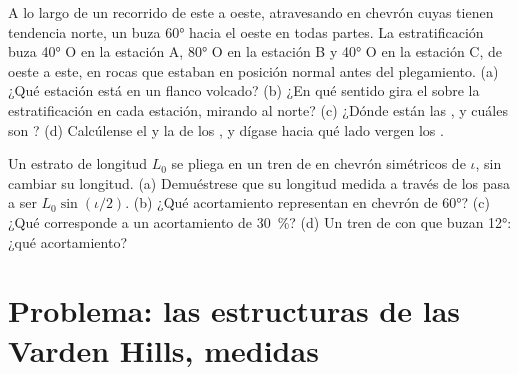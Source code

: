 \begin{exercise}[$\star\star\star$]\label{exo:b1:faults-folds-fabrics:11}
A lo largo de un recorrido de este a oeste, atravesando  en chevrón cuyas  tienen tendencia norte, un  buza \ang{60} hacia el oeste en todas partes. La estratificación buza \ang{40} O en la estación A, \ang{80} O en la
estación B y \ang{40} O en la estación C, de oeste a este, en rocas que estaban en posición normal antes del plegamiento. (a) ¿Qué
estación está en un flanco volcado? (b) ¿En qué sentido gira el  sobre la estratificación en cada estación, mirando al
norte? (c) ¿Dónde están las , y cuáles son ? (d) Calcúlense el  y la  de los
, y dígase hacia qué lado vergen los .
\end{exercise}

\begin{exercise}[$\star\star\star$]\label{exo:b1:faults-folds-fabrics:12}
Un estrato de longitud $L_0$ se pliega en un tren de  en chevrón simétricos de  $\iota$, sin cambiar
su longitud. (a) Demuéstrese que su longitud medida a través de los  pasa a ser $L_0\sin(\iota/2)$. (b) ¿Qué acortamiento
representan  en chevrón de  \ang{60}? (c) ¿Qué  corresponde a un acortamiento de
\qty{30}{\percent}? (d) Un tren de  con  que buzan \ang{12}: ¿qué acortamiento?
\end{exercise}

\section{Problema: las estructuras de las Varden Hills, medidas}


